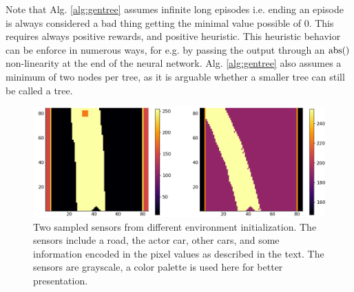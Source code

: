 \documentclass{article}
\begin{document}
Note that Alg. \ref{alg:gentree} assumes infinite long episodes i.e. ending an episode is always considered a bad thing getting the minimal value possible of $0$. This requires always positive rewards, and positive heuristic. This heuristic behavior can be enforce in numerous ways, for e.g. by passing the output through an $\rm abs()$ non-linearity at the end of the neural network. Alg. \ref{alg:gentree} also assumes a minimum of two nodes per tree, as it is arguable whether a smaller tree can still be called a tree.

\begin{figure}
  \centering
  \includegraphics[width=1.0\textwidth]{images/sensors.png}
  \caption{Two sampled sensors from different environment initialization. The sensors include a road, the actor car, other cars, and some information encoded in the pixel values as described in the text. The sensors are grayscale, a color palette is used here for better presentation. }
  \label{fig:sensors}
\end{figure}
\end{document}

